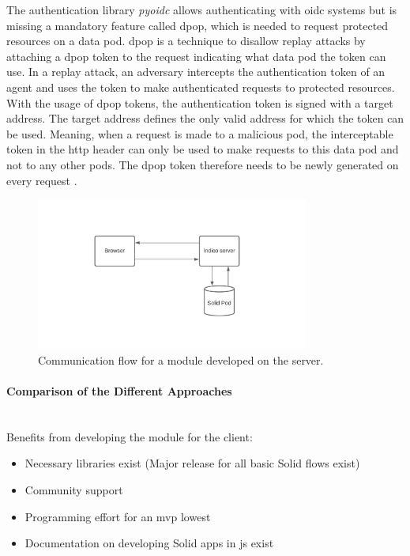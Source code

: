 The authentication library \textit{pyoidc} allows authenticating with \gls{oidc} systems but is missing a mandatory feature called \gls{dpop}, which is needed to request protected resources on a data pod. \gls{dpop} is a technique to disallow replay attacks by attaching a \gls{dpop} token to the request indicating what data pod the token can use. In a replay attack, an adversary intercepts the authentication token of an agent and uses the token to make authenticated requests to protected resources. With the usage of \gls{dpop} tokens, the authentication token is signed with a target address. The target address defines the only valid address for which the token can be used. Meaning, when a request is made to a malicious pod, the interceptable token in the \gls{http} header can only be used to make requests to this data pod and not to any other pods. The \gls{dpop} token therefore needs to be newly generated on every request \cite{dpop-spec}.

\begin{figure}
    \centering
    \includegraphics[width=0.8\textwidth]{prototype/graphs/poc-infrastructure-backend.jpeg}
    \caption{Communication flow for a module developed on the server.}
    \label{fig:poc-infrastructure-backend}
\end{figure}
\vspace{0.5cm}
\paragraph{Comparison of the Different Approaches}\mbox{}\\

Benefits from developing the module for the client:

\begin{itemize}
    \item Necessary libraries exist (Major release for all basic Solid flows exist)
    \item Community support
    \item Programming effort for an \gls{mvp} lowest
    \item Documentation on developing Solid apps in \gls{js} exist
\end{itemize}

